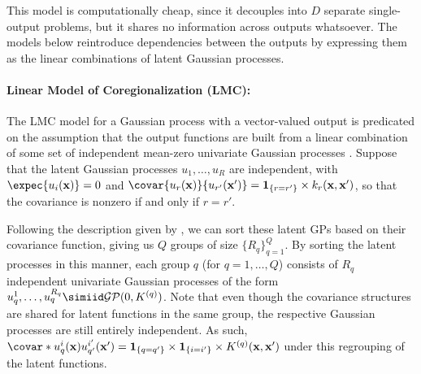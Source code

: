 \documentclass[10pt]{article}
\numberwithin{equation}{section}
\newcommand{\calGP}{\mathcal{GP}}
\begin{document}
This model is computationally cheap, since it decouples into $D$ separate single-output problems, but it shares no information across outputs whatsoever. The models below reintroduce dependencies between the outputs by expressing them as the linear combinations of latent Gaussian processes.

\paragraph{Linear Model of Coregionalization (LMC):} The LMC model for a Gaussian process with a vector-valued output is predicated on the assumption that the output functions are built from a linear combination of some set of independent mean-zero univariate Gaussian processes \citep{Alvarez-Vector-Kernels-2012}. Suppose that the latent Gaussian processes $u_{1}, \dots, u_{R}$ are independent, with $\expec{u_{i}(\bfx)} = 0$ and $\covar{u_{r}(\bfx)}{u_{r'}(\bfx')} = \mathbf{1}_{\{r = r'\}} \times k_{r}(\bfx, \bfx')$, so that the covariance is nonzero if and only if $r = r'$. 

Following the description given by \citet{Alvarez-Vector-Kernels-2012}, we can sort these latent GPs based on their covariance function, giving us $Q$ groups of size $\{R_{q}\}_{q=1}^{Q}$. By sorting the latent processes in this manner, each group $q$ (for $q = 1, \dots, Q$) consists of $R_{q}$ independent univariate Gaussian processes of the form $u_{q}^{1}, \dots, u_{q}^{R_{q}} \simiid \calGP(0, K^{(q)})$. Note that even though the covariance structures are shared for latent functions in the same group, the respective Gaussian processes are still entirely independent. As such, $\covar*{u_{q}^{i}(\bfx)}{u_{q'}^{i'}(\bfx')} = \mathbf{1}_{\{q = q'\}} \times \mathbf{1}_{\{i = i'\}} \times K^{(q)}(\bfx, \bfx')$ under this regrouping of the latent functions.
\end{document}
